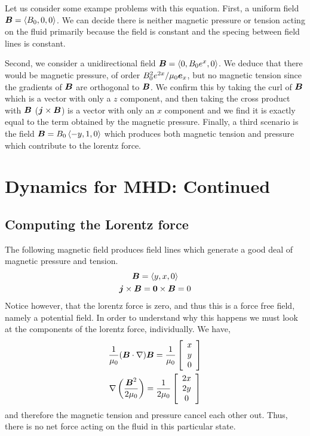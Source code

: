 \documentclass{article}
\begin{document}
Let us consider some exampe problems with this equation. First, a uniform field
$\boldsymbol{B} = \left< B_0, 0, 0\right>$. We can decide there is neither magnetic pressure
or tension acting on the fluid primarily because the field is constant and the
specing between field lines is constant. 

Second, we consider a unidirectional field $\boldsymbol{B} = \left< 0, B_0e^x, 0\right>$. We
deduce that there would be magnetic pressure, of order $B_0^2e^{2x}/\mu_0\boldsymbol{e}_x$, but no
magnetic tension since the gradients of $\boldsymbol{B}$ are orthogonal to $\boldsymbol{B}$. We confirm
this by taking the curl of $\boldsymbol{B}$ which is a vector with only a $z$ component, and
then taking the cross product with $\boldsymbol{B}$ ($\boldsymbol{j} \times \boldsymbol{B}$) is a vector with
only an $x$ component and we find it is exactly equal to the term obtained by
the magnetic pressure. Finally, a third scenario is the field $\boldsymbol{B} = B_0\left<
-y, 1, 0\right>$ which produces both magnetic tension and pressure which
contribute to the lorentz force. 

\section{Dynamics for MHD: Continued}
\subsection{Computing the Lorentz force}
The following magnetic field produces field lines which generate a good deal of
magnetic pressure and tension. 
\begin{gather*}
    \boldsymbol{B} = \left<y, x, 0\right> \\
    \boldsymbol{j} \times \boldsymbol{B} = \boldsymbol{0} \times \boldsymbol{B} = 0
\end{gather*}
Notice however, that the lorentz force is zero, and thus this is a force free
field, namely a potential field. In order to understand why this happens we must
look at the components of the lorentz force, individually. We have, 
\begin{gather*}
    \frac{1}{\mu_0}(\boldsymbol{B}\cdot\nabla)\boldsymbol{B} = \frac{1}{\mu_0}\left[\begin{array}{c}
    x\\y\\0\end{array}\right]\\
    \nabla\left(\frac{\boldsymbol{B}^2}{2\mu_0}\right) =
    \frac{1}{2\mu_0}\left[\begin{array}{c} 2x\\2y\\0\end{array}\right]
\end{gather*}
and therefore the magnetic tension and pressure cancel each other out. Thus,
there is no net force acting on the fluid in this particular state. 
\end{document}
